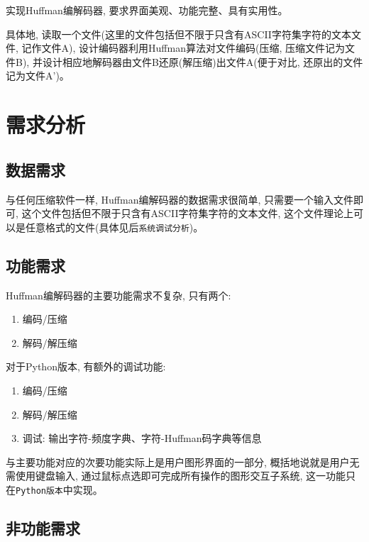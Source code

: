 \documentclass{ctexart}
\begin{document}
实现Huffman编解码器, 要求界面美观、功能完整、具有实用性。

具体地,
读取一个文件(这里的文件包括但不限于只含有ASCII字符集字符的文本文件, 记作文件A), 设计编码器利用Huffman算法对文件编码(压缩, 压缩文件记为文件B), 并设计相应地解码器由文件B还原(解压缩)出文件A(便于对比, 还原出的文件记为文件A')。


\section{需求分析}\label{header-n32}

\subsection{数据需求}\label{header-n33}

与任何压缩软件一样, Huffman编解码器的数据需求很简单, 只需要一个输入文件即可, 这个文件包括但不限于只含有ASCII字符集字符的文本文件, 这个文件理论上可以是任意格式的文件(具体见后\texttt{系统调试分析})。

\subsection{功能需求}\label{header-n35}

Huffman编解码器的主要功能需求不复杂, 只有两个:

\begin{enumerate}
\def\labelenumi{\arabic{enumi}.}
\item
  编码/压缩
\item
  解码/解压缩
\end{enumerate}

对于Python版本, 有额外的调试功能:

\begin{enumerate}
\def\labelenumi{\arabic{enumi}.}
\item
  编码/压缩
\item
  解码/解压缩
\item
  调试: 输出字符-频度字典、字符-Huffman码字典等信息
\end{enumerate}

与主要功能对应的次要功能实际上是用户图形界面的一部分, 概括地说就是用户无需使用键盘输入, 通过鼠标点选即可完成所有操作的图形交互子系统, 这一功能只在\texttt{Python版本}中实现。

\subsection{非功能需求}\label{header-n51}
\end{document}
